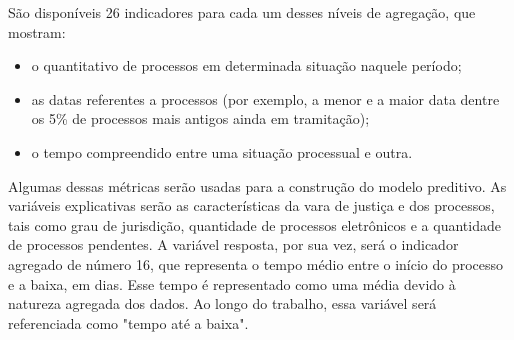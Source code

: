 São disponíveis 26 indicadores para cada um desses níveis de agregação, que mostram: 

\begin{itemize}
    \item o quantitativo de processos em determinada situação naquele período;
    \item as datas referentes a processos (por exemplo, a menor e a maior data dentre os 5\% de processos mais antigos ainda em tramitação);
    \item o tempo compreendido entre uma situação processual e outra.
    
\end{itemize}

Algumas dessas métricas serão usadas para a construção do modelo preditivo. As variáveis explicativas serão as características da vara de justiça e dos processos, tais como grau de jurisdição, quantidade de processos eletrônicos e a quantidade de processos pendentes. A variável resposta, por sua vez, será o indicador agregado de número 16, que representa o tempo médio entre o início do processo e a baixa, em dias. Esse tempo é representado como uma média devido à natureza agregada dos dados. Ao longo do trabalho, essa variável será referenciada como "tempo até a baixa".
